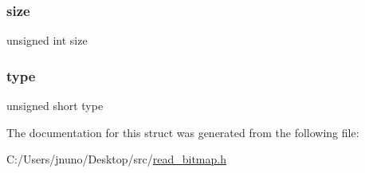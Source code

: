 \hypertarget{struct_bitmap_file_header_aac913b3a1f6ef005d66bf7a84428773e}{}\label{struct_bitmap_file_header_aac913b3a1f6ef005d66bf7a84428773e} 
\subsubsection{\texorpdfstring{size}{size}}
{\footnotesize\ttfamily unsigned int size}

\hypertarget{struct_bitmap_file_header_aa929142c5ddf34cf0915c97a617a1a63}{}\label{struct_bitmap_file_header_aa929142c5ddf34cf0915c97a617a1a63} 
\subsubsection{\texorpdfstring{type}{type}}
{\footnotesize\ttfamily unsigned short type}



The documentation for this struct was generated from the following file\+:\begin{DoxyCompactItemize}
\item 
C\+:/\+Users/jnuno/\+Desktop/src/\hyperlink{read__bitmap_8h}{read\+\_\+bitmap.\+h}\end{DoxyCompactItemize}
